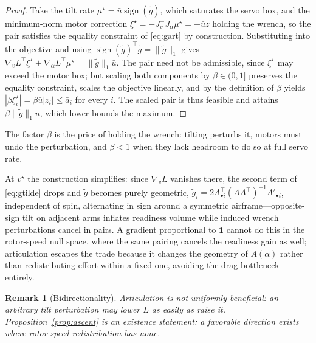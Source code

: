 \documentclass[letter, 10 pt, journal, twoside]{IEEEtran}
\theoremstyle{compact}
\newtheorem{remark}[theorem]{Remark}
\begin{document}
\begin{proof}
Take the tilt rate $\mu^\star=\bar u\operatorname{sign}(\tilde g)$, which saturates the servo box, and the minimum-norm motor correction $\xi^\star=-J_v^{+}J_\alpha\mu^\star =-\bar u z$ holding the wrench, so the pair satisfies the equality constraint of \eqref{eq:gart} by construction. Substituting into the objective and using $\operatorname{sign}(\tilde g)^{\!\top}\tilde g=\|\tilde g\|_1$ gives $\nabla_v L^{\!\top}\xi^\star+\nabla_\alpha L^{\!\top}\mu^\star=\|\tilde g\|_1\bar u$. The pair need not be admissible, since $\xi^\star$ may exceed the motor box; but scaling both components by $\beta\in(0,1]$ preserves the equality constraint, scales the objective linearly, and by the definition of $\beta$ yields $|\beta\xi^\star_i|=\beta\bar u|z_i|\le \bar a_i$ for every $i$. The scaled pair is thus feasible and attains $\beta\|\tilde g\|_1\bar u$, which lower-bounds the maximum.
\end{proof}
 
The factor $\beta$ is the price of holding the wrench: tilting perturbs it, motors must undo the perturbation, and $\beta<1$ when they lack headroom to do so at full servo rate.
 
At $v^\star$ the construction simplifies: since $\nabla_v L$ vanishes there, the second term of \eqref{eq:gtilde} drops and $\tilde g$ becomes purely geometric, $\tilde g_i = 2A_{\bullet i}^{\!\top}(AA^{\!\top})^{-1}A'_{\bullet i}$, independent of spin, alternating in sign around a symmetric airframe---opposite-sign tilt on adjacent arms inflates readiness volume while induced wrench perturbations cancel in pairs. A gradient proportional to $\mathbf{1}$ cannot do this in the rotor-speed null space, where the same pairing cancels the readiness gain as well; articulation escapes the trade because it changes the geometry of $A(\alpha)$ rather than redistributing effort within a fixed one, avoiding the drag bottleneck entirely.
 
\begin{remark}[Bidirectionality]\label{rem:bidirectional}
Articulation is not uniformly beneficial: an arbitrary tilt perturbation may lower $L$ as easily as raise it. Proposition~\ref{prop:ascent} is an existence statement: a favorable direction exists where rotor-speed redistribution has none.%
\end{remark}

\end{document}
